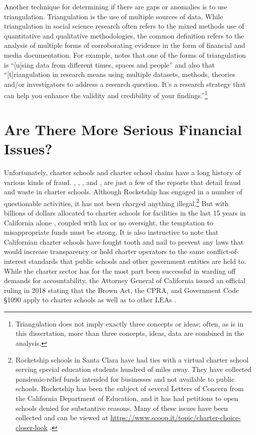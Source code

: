 Another technique for determining if there are gaps or anomalies is to use triangulation. Triangulation is the use of multiple sources of data. While triangulation in social science research often refers to the mixed methods use of quantitative and qualitative methodologies, the common definition refers to the analysis of multiple forms of corroborating evidence in the form of financial and media documentation. For example,  \textcite{Bhandari2022} notes that one of the forms of triangulation is ``[u]sing data from different times, spaces and people'' and also that ``[t]riangulation in research means using multiple datasets, methods, theories and/or investigators to address a research question. It’s a research strategy that can help you enhance the validity and credibility of your findings.''\footnote{Triangulation does not imply exactly three concepts or ideas; often, as is in this dissertation, more than three concepts, ideas, data are combined in the analysis.}

\section{Are There More Serious Financial Issues?}\label{serious-problems}\indent

Unfortunately, charter schools and charter school chains have a long history of various kinds of fraud. \textcite{Lafer2017}, \textcite{ITPT2018}, \textcite{Burris.etal2020}, and \textcite{Burris.Bryant2020}, are just a few of the reports that detail fraud and waste in charter schools. Although Rocketship has engaged in a number of questionable activities, it has not been charged anything illegal.\footnote{Rocketship schools in Santa Clara have had ties with a virtual charter school serving special education students hundred of miles away. They have collected pandemic-relief funds intended for businesses and not available to public schools. Rocketship has been the subject of several Letters of Concern from the California Department of Education, and it has had petitions to open schools denied for substantive reasons. Many of these issues have been collected and can be viewed at \url{https://www.scoop.it/topic/charter-choice-closer-look} \parencite{Marachi2022}.} But with billions of dollars allocated to charter schools for facilities in the last 15 years in California alone \parencite[4]{Lafer2017}, coupled with lax or no oversight, the temptation to misappropriate funds must be strong. It is also instructive to note that Californian charter schools have fought tooth and nail to prevent any laws that would increase transparency or hold charter operators to the same conflict-of-interest standards that public schools and other government entities are held to. While the charter sector has for the most part been successful in warding off demands for accountability, the Attorney General of California issued an official ruling in 2018 stating that the Brown Act, the CPRA, and Government Code §1090 apply to charter schools as well as to other LEAs \parencite{Becerra.Medeiros2018}.

